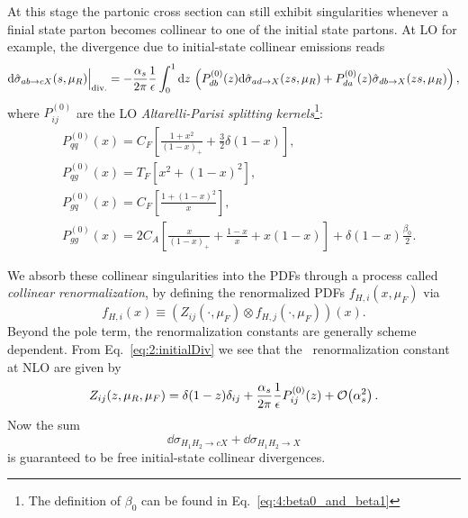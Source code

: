At this stage the partonic cross section can still exhibit singularities whenever a finial state parton becomes collinear to one of the initial state partons. At \acs{LO} for example, the divergence due to initial-state collinear emissions reads
\begin{equation}
\mathrm{d} \hat{\sigma}_{a b \rightarrow c X}(s, \mu_R) \Big\vert_{\text{div.}} = - \frac{\alpha_s}{2 \pi} \frac{1}{\epsilon}  \int_0^1 \mathrm{d} z\, \left(P_{db}^{(0)}(z) \mathrm{d} \hat{\sigma}_{a d \rightarrow X}(z s, \mu_R) + P_{da}^{(0)}(z) \hat{\sigma}_{d b \rightarrow X}(zs, \mu_R) \right),
\label{eq:2:initialDiv}
\end{equation}
where $P_{ij}^{(0)}$ are the \acs{LO} \textit{Altarelli-Parisi splitting kernels}\footnote{The definition of $\beta_0$ can be found in Eq.~\eqref{eq:4:beta0_and_beta1}}:
\begin{equation}
\begin{split}
&P_{qq}^{(0)}(x) = C_F \left[ \frac{1 + x^2}{(1 - x)_+} + \frac{3}{2} \delta (1 - x) \right], \\[3mm]
&P_{qg}^{(0)}(x) = T_F \left[ x^2 + (1 - x)^2 \right], \\[3mm]
&P_{gq}^{(0)}(x) = C_F \left[ \frac{1 + (1 - x)^2}{x} \right], \\[2mm]
&P_{gg}^{(0)}(x) = 2C_A \left[ \frac{x}{(1 - x)_+} + \frac{1 - x}{x} + x (1 - x) \right] + \delta(1 - x) \frac{\beta_0}{2}.
\end{split}
\label{eq:2:Altarelli_Parisi_splitting_functions}
\end{equation}

We absorb these collinear singularities into the PDFs through a process called \textit{collinear renormalization}, by defining the renormalized \acs{PDF}s $f_{H, i}(x, \mu_F)$ via
\begin{equation}
f_{H, i}(x) \equiv (Z_{ij}(\cdot, \mu_F) \otimes f_{H, j}(\cdot, \mu_F))(x).
\end{equation}
Beyond the pole term, the renormalization constants are generally scheme dependent. From Eq.~\eqref{eq:2:initialDiv} we see that the \MS\ renormalization constant at NLO are given by
\begin{equation}
Z_{ij}(z, \mu_R, \mu_F) = \delta(1 - z) \delta_{ij} + \frac{\alpha_s}{2 \pi} \frac{1}{\epsilon} P_{ij}^{(0)}(z) + \mathcal{O}\!\left(\alpha_s^2\right).
\end{equation}
Now the sum
\begin{equation}
\dd \sigma_{H_1 H_2 \rightarrow c X} + \dd \sigma_{H_1 H_2 \rightarrow X}
\end{equation}
is guaranteed to be free initial-state collinear divergences.


